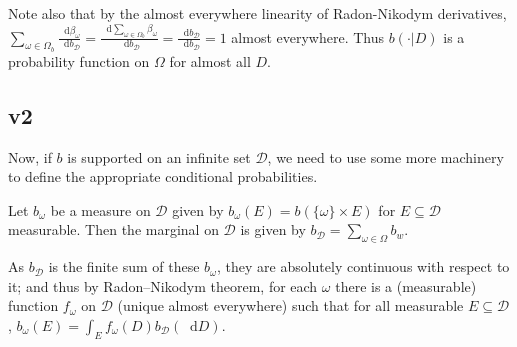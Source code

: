 \documentclass[a4paper]{article}
\newcommand\Exp{\mathsf{Exp}}
\newcommand\U{\mathfrak{U}} %
\newcommand{\D}{\mathcal{D}}
\newcommand{\Decs}{\mathcal{D}}
\newcommand\s{\mathsf{s}}
\newcommand{\n}{\mathsf{n}}
\renewcommand{\Re}{\mathbb{R}}
\renewcommand{\color}[1]{}
\newenvironment{colored}[1]{\leavevmode\color{#1}}{}
\newcommand*\diff{\mathop{}\!\mathrm{d}}
\newenvironment{CCM rewritten}
{\begingroup\color{blue}} %
{\endgroup}              %
\begin{document}
\begin{colored}{violet}
\begin{colored}{red}
Note also that by the almost everywhere linearity of Radon-Nikodym derivatives, $\sum_{\omega\in\Omega_b}\frac{\diff \beta_\omega}{\diff b_\Decs}=\frac{\diff \sum_{\omega\in\Omega_b}\beta_\omega}{\diff b_\Decs}=\frac{\diff b_\Decs}{\diff b_\Decs}=1$ almost everywhere. Thus $b(\cdot|D)$ is a probability function on $\Omega$ for almost all $D$.


\subsection{v2}
	

%
%
%
%
%
%
Now, if $b$ is supported on an infinite set $\Decs$, we need to use some more machinery to define the appropriate conditional probabilities. 



Let $b_\omega$ be a measure on $\Decs$ given by $b_\omega(E)=b(\{\omega\}\times E)$ for $E\subseteq \Decs$ measurable. 
Then the marginal on $\Decs$ is given by  $b_\D=\sum_{\omega\in\Omega} b_w$. 

As $b_\D$ is the finite sum of these $b_\omega$, they are absolutely continuous with respect to it; and thus by Radon–Nikodym theorem, for each $\omega$ there is a (measurable) function $f_\omega$ on $\Decs$ (unique almost everywhere) such that for all measurable $E\subseteq\Decs$, $b_\omega(E)=\int_{E}f_\omega(D) b_\D(\diff D)$. 



\end{colored}
\end{colored}
\end{document}
